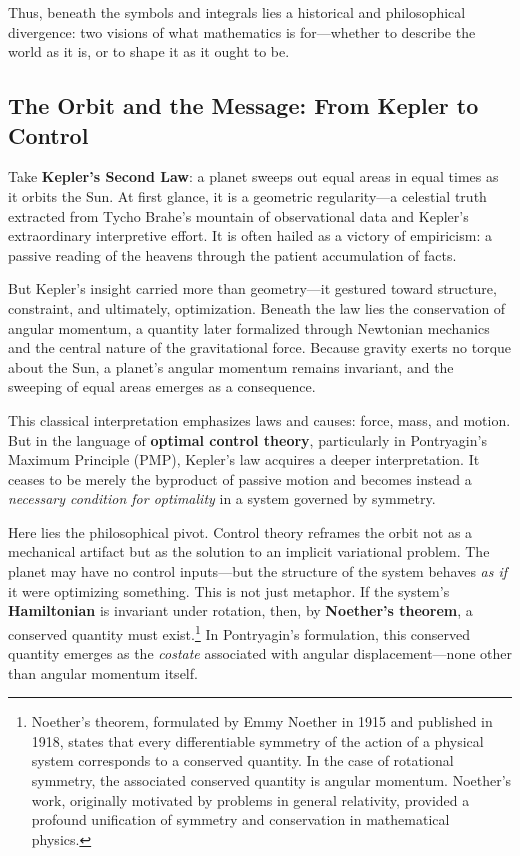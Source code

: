 Thus, beneath the symbols and integrals lies a historical and philosophical divergence: two visions of what mathematics is for—whether to describe the world as it is, or to shape it as it ought to be.

\subsection{The Orbit and the Message: From Kepler to Control}

Take \textbf{Kepler’s Second Law}: a planet sweeps out equal areas in equal times as it orbits the Sun. At first glance, it is a geometric regularity—a celestial truth extracted from Tycho Brahe’s mountain of observational data and Kepler’s extraordinary interpretive effort. It is often hailed as a victory of empiricism: a passive reading of the heavens through the patient accumulation of facts.

But Kepler’s insight carried more than geometry—it gestured toward structure, constraint, and ultimately, optimization. Beneath the law lies the conservation of angular momentum, a quantity later formalized through Newtonian mechanics and the central nature of the gravitational force. Because gravity exerts no torque about the Sun, a planet’s angular momentum remains invariant, and the sweeping of equal areas emerges as a consequence.

This classical interpretation emphasizes laws and causes: force, mass, and motion. But in the language of \textbf{optimal control theory}, particularly in Pontryagin’s Maximum Principle (PMP), Kepler’s law acquires a deeper interpretation. It ceases to be merely the byproduct of passive motion and becomes instead a \emph{necessary condition for optimality} in a system governed by symmetry.

Here lies the philosophical pivot. Control theory reframes the orbit not as a mechanical artifact but as the solution to an implicit variational problem. The planet may have no control inputs—but the structure of the system behaves \emph{as if} it were optimizing something. This is not just metaphor. If the system’s \textbf{Hamiltonian} is invariant under rotation, then, by \textbf{Noether’s theorem}, a conserved quantity must exist.\footnote{Noether’s theorem, formulated by Emmy Noether in 1915 and published in 1918, states that every differentiable symmetry of the action of a physical system corresponds to a conserved quantity. In the case of rotational symmetry, the associated conserved quantity is angular momentum. Noether’s work, originally motivated by problems in general relativity, provided a profound unification of symmetry and conservation in mathematical physics.} In Pontryagin’s formulation, this conserved quantity emerges as the \emph{costate} associated with angular displacement—none other than angular momentum itself.

